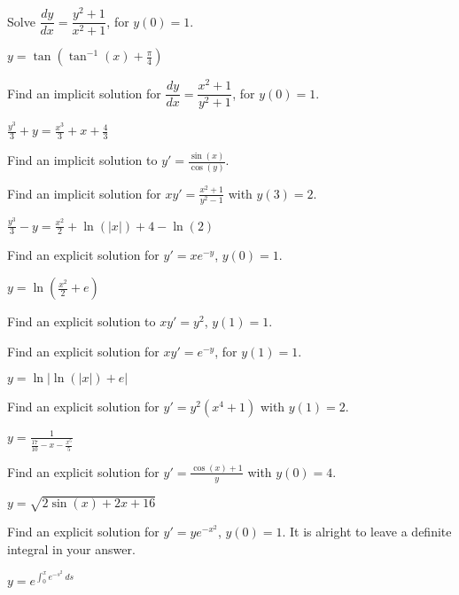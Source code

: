 \begin{exercise}
Solve $\dfrac{dy}{dx} = \dfrac{y^2+1}{x^2+1}$, for $y(0) = 1$.
\end{exercise}
\comboSol{%
}
{%
$y = \tan\left(\tan^{-1}(x) + \frac{\pi}{4}\right)$
}

\begin{exercise}
Find an implicit solution for
$\dfrac{dy}{dx} = \dfrac{x^2+1}{y^2+1}$, for $y(0) = 1$.
\end{exercise}
\comboSol{%
}
{%
$\frac{y^3}{3} + y = \frac{x^3}{3} + x + \frac{4}{3}$
}

\begin{exercise}\ansMark%
Find an implicit solution to $y' = \frac{\sin(x)}{\cos(y)}$.
\end{exercise}

\begin{exercise}
Find an implicit solution for $xy' = \frac{x^2 + 1}{y^2 - 1}$ with $y(3) = 2$.
\end{exercise}
\comboSol{%
}
{%
$\frac{y^3}{3} - y = \frac{x^2}{2} +\ln(|x|) + 4 - \ln(2)$
}

\begin{exercise}
Find an explicit solution for $y' = xe^{-y}$, $y(0)=1$.
\end{exercise}
\comboSol{%
}
{%
$y = \ln\left(\frac{x^2}{2} + e \right)$
}

\begin{exercise}\ansMark%
Find an explicit solution to $x y' = y^2$, $y(1) = 1$.
\end{exercise}

\begin{exercise}
Find an explicit solution for $xy' = e^{-y}$, for $y(1)=1$.
\end{exercise}
\comboSol{%
}
{%
$y = \ln|\ln(|x|) + e|$
}

\begin{exercise}
Find an explicit solution for $y' = y^2(x^4 + 1)$ with $y(1) = 2$. 
\end{exercise}
\comboSol{%
}
{%
$y = \frac{1}{\frac{17}{10} - x - \frac{x^5}{5}}$
}

\begin{exercise}
Find an explicit solution for $y' = \frac{\cos(x)+ 1}{y}$ with $y(0) = 4$. 
\end{exercise}
\comboSol{%
}
{%
$y = \sqrt{2\sin(x) + 2x + 16}$
}

\begin{exercise}
Find an explicit solution for $y' = ye^{-x^2}$, $y(0)=1$.  It is alright to
leave a definite integral in your answer.
\end{exercise}
\comboSol{%
}
{%
$y = e^{\int_0^x e^{-s^2}\ ds}$
}

